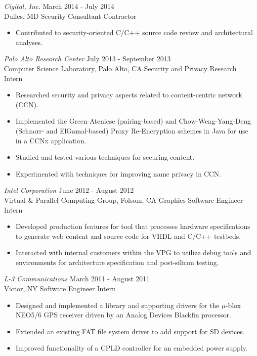 \documentclass[10pt]{res} %
\begin{document}
\begin{resume}
{\sl Cigital, Inc.} \hfill March 2014 - July 2014 \\
Dulles, MD \hfill Security Consultant Contractor
\begin{itemize} \itemsep -2pt %
\item Contributed to security-oriented C/C++ source code review and architectural analyses.
\end{itemize}

{\sl Palo Alto Research Center} \hfill July 2013 - September 2013 \\
Computer Science Laboratory, Palo Alto, CA \hfill Security and Privacy Research Intern
\begin{itemize} \itemsep -2pt %
\item Researched security and privacy aspects related to content-centric network (CCN).
\item Implemented the Green-Ateniese (pairing-based) and Chow-Weng-Yang-Deng (Schnorr- and ElGamal-based) Proxy Re-Encryption schemes in Java for use in a CCNx application.
\item Studied and tested various techniques for securing content.
\item Experimented with techniques for improving name privacy in CCN.
\end{itemize}

{\sl Intel Corporation} \hfill June 2012 - August 2012 \\
Virtual \& Parallel Computing Group, Folsom, CA \hfill Graphics Software Engineer Intern
\begin{itemize} \itemsep -2pt %
\item Developed production features for tool that processes hardware specifications to generate web content and source code for VHDL and C/C++ testbeds.
\item Interacted with internal customers within the VPG to utilize debug tools and environments for architecture specification and post-silicon testing.
\end{itemize}

{\sl L-3 Communications} \hfill March 2011 - August 2011 \\
Victor, NY \hfill Software Engineer Intern
\begin{itemize} \itemsep -2pt %
\item Designed and implemented a library and supporting drivers for the $\mu$-blox NEO5/6 GPS receiver driven by an Analog Devices Blackfin processor.
\item Extended an existing FAT file system driver to add support for SD devices.
\item Improved functionality of a CPLD controller for an embedded power supply.
\end{itemize}


\end{resume}
\end{document}
